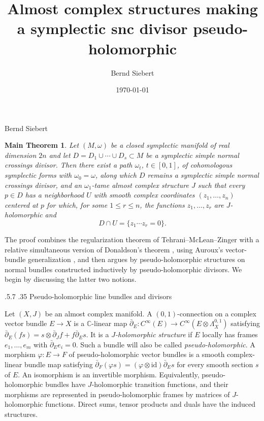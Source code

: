 \documentclass[11pt]{amsart}
\title{Almost complex structures making a symplectic snc divisor
pseudo-holomorphic}
\author{Bernd Siebert}
\date{\today}
\makeatletter
\numberwithin{equation}{section}
\renewcommand{\section}{%
  \@startsection{section}{1}%
    \z@
    {.5\linespacing\@plus.7\linespacing}%
    {.35\linespacing}%
    {\normalfont\bfseries}}
\theoremstyle{plain}
\newtheorem*{maintheorem}{Main Theorem}
\theoremstyle{definition}
\newcommand{\CC}{\mathbb{C}}
\newcommand{\delbar}{\bar\partial}
\makeatother
\begin{document}
\begin{center}
{\large Bernd Siebert}
\end{center}
\begin{maintheorem}
Let $(M,\omega)$ be a closed symplectic manifold of real dimension $2n$ and
let $D=D_1\cup\cdots\cup D_s\subset M$ be a symplectic simple normal
crossings divisor. Then there exist a path $\omega_t$, $t\in[0,1]$, of
cohomologous symplectic forms with $\omega_0=\omega$, along which $D$ remains
a symplectic simple normal crossings divisor, and an $\omega_1$-tame almost
complex structure $J$ such that every $p\in D$ has a neighborhood $U$ with
smooth complex coordinates $(z_1,\ldots,z_n)$ centered at $p$ for which, for
some $1\le r\le n$, the functions $z_1,\ldots,z_r$ are $J$-holomorphic and
\[
D\cap U=\{z_1\cdots z_r=0\}.
\]
\end{maintheorem}

The proof combines the regularization theorem of Tehrani--McLean--Zinger
\cite{TMZ1} with a relative simultaneous version of Donaldson's theorem
\cite{Donaldson}, using Auroux's vector-bundle generalization \cite{Auroux}, and
then argues by pseudo-holomorphic structures on normal bundles constructed
inductively by pseudo-holomorphic divisors. We begin by discussing the latter
two notions.


\section{Pseudo-holomorphic line bundles and divisors}
\label{SS: Pshol line bundles}

Let $(X,J)$ be an almost complex manifold. A $(0,1)$-connection on a complex
vector bundle $E\to X$ is a $\CC$-linear map $\delbar_E:C^\infty(E)\to
C^\infty(E\otimes\Lambda_X^{0,1})$ satisfying
$\delbar_E(fs)=s\otimes\delbar_Jf+f\delbar_Es$. It is a \emph{$J$-holomorphic
structure} if $E$ locally has frames $e_1,\ldots,e_m$ with $\delbar_Ee_i=0$.
Such a bundle will also be called \emph{pseudo-holomorphic}. A morphism
$\varphi:E\to F$ of pseudo-holomorphic vector bundles is a smooth complex-linear
bundle map satisfying $\delbar_F(\varphi s) =
(\varphi\otimes\mathrm{id})\delbar_Es$ for every smooth section $s$ of $E$. An
isomorphism is an invertible morphism. Equivalently, pseudo-holomorphic bundles
have $J$-holomorphic transition functions, and their morphisms are represented
in pseudo-holomorphic frames by matrices of $J$-holomorphic functions. Direct
sums, tensor products and duals have the induced structures.
\end{document}
